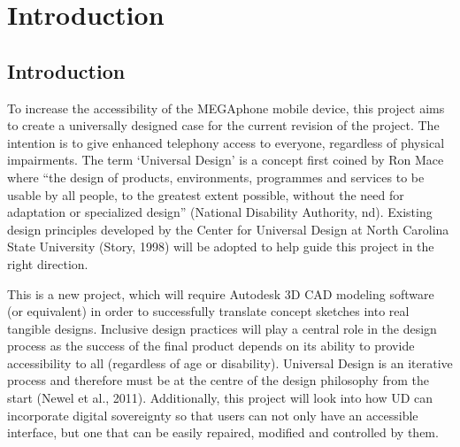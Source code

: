 
\chapter{Introduction}\label{chapter:firstchapter} %

\label{Chapter1} %


\section{Introduction}\label{sec:firstsection}


To increase the accessibility of the MEGAphone mobile device, this project aims to create a universally designed case for the current revision of the project.
The intention is to give enhanced telephony access to everyone, regardless of physical impairments. 
The term ‘Universal Design’ is a concept first coined by Ron Mace where “the design of products, environments, programmes and services to be usable by all people, to the greatest extent possible, without the need for adaptation or specialized design” (National Disability Authority, nd). 
Existing design principles developed by the Center for Universal Design at North Carolina State University (Story, 1998) will be adopted to help guide this project in the right direction.

This is a new project, which will require Autodesk 3D CAD modeling software (or equivalent) in order to successfully translate concept sketches into real tangible designs. 
Inclusive design practices will play a central role in the design process as the success of the final product depends on its ability to provide accessibility to all (regardless of age or disability). 
Universal Design is an iterative process and therefore must be at the centre of the design philosophy from the start (Newel et al., 2011). 
Additionally, this project will look into how UD can incorporate digital sovereignty so that users can not only have an accessible interface, but one that can be easily repaired, modified and controlled by them.

